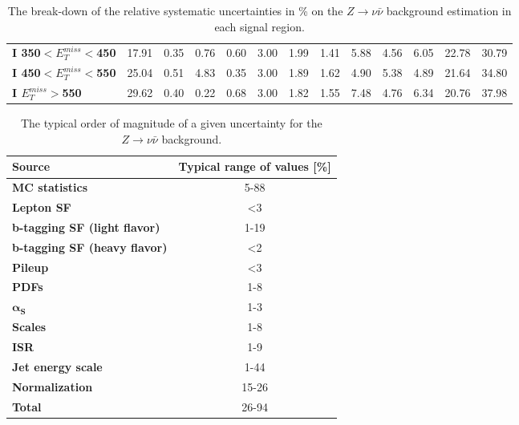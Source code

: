 \begin{table}[h]
\begin{center}
{\begin{tabular}{|l|ccccccccccc|c|}
\textbf{ I 350$<E_T^{miss}<$450}         & 17.91         & 0.35          & 0.76          & 0.60          & 3.00          & 1.99          & 1.41          & 5.88          & 4.56          & 6.05          & 22.78         & 30.79         \\
\textbf{ I 450$<E_T^{miss}<$550}         & 25.04         & 0.51          & 4.83          & 0.35          & 3.00          & 1.89          & 1.62          & 4.90          & 5.38          & 4.89          & 21.64         & 34.80         \\
\textbf{ I $E_T^{miss}>$550}    & 29.62         & 0.40          & 0.22          & 0.68          & 3.00          & 1.82          & 1.55          & 7.48          & 4.76          & 6.34          & 20.76         & 37.98         \\
\hline
\end{tabular}}
\caption[Table caption text]{The break-down of the relative systematic uncertainties in \% on the $Z \to \nu \bar{\nu}$ background estimation in each signal region.   }
\label{tab:SysZnunu}
\end{center}
\end{table}


\begin{table}[h]
\begin{center}
\begin{tabular}{|l|c|}
\hline
\textbf{Source}       & \textbf{Typical range of values} [\%]                       \\
\hline
\textbf{MC statistics}      &  5-88   \\
\hline
\textbf{Lepton SF}              &  <3  \\
\textbf{b-tagging SF (light flavor)}      &  1-19  \\
\textbf{b-tagging SF (heavy flavor)}      &  <2  \\
\textbf{Pileup}                          &  <3  \\
\textbf{PDFs}                 &  1-8  \\
\textbf{$\mathbf{\alpha_{S}}$}                 &  1-3  \\
\textbf{Scales}                 &  1-8  \\
\textbf{ISR}                 &  1-9  \\
\textbf{Jet energy scale}                 &  1-44  \\
\textbf{Normalization}                 &  15-26  \\
\hline
\textbf{Total}                 &  26-94  \\
\hline
\end{tabular}
\caption[Table caption text]{The typical order of magnitude of a given uncertainty for the $Z \to \nu \bar{\nu}$ background.  }
\label{tab:SysZnunuSum}
\end{center}
\end{table}

